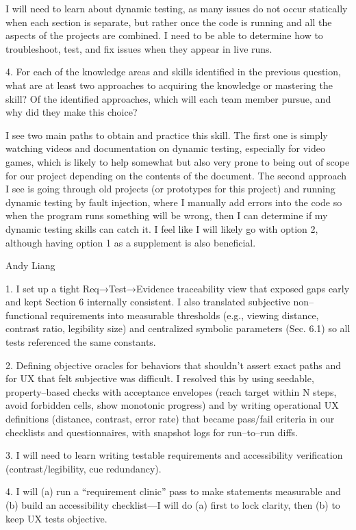 \documentclass[12pt, titlepage]{article}
\begin{document}
I will need to learn about dynamic testing, as many issues do not occur statically when each section is separate, but rather once the code is running and all the aspects of the projects are combined. I need to be able to determine how to troubleshoot, test, and fix issues when they appear in live runs.

4. For each of the knowledge areas and skills identified in the previous question, what are at least two approaches to acquiring the knowledge or mastering the skill? Of the identified approaches, which will each team member pursue, and why did they make this choice?

I see two main paths to obtain and practice this skill. The first one is simply watching videos and documentation on dynamic testing, especially for video games, which is likely to help somewhat but also very prone to being out of scope for our project depending on the contents of the document. The second approach I see is going through old projects (or prototypes for this project) and running dynamic testing by fault injection, where I manually add errors into the code so when the program runs something will be wrong, then I can determine if my dynamic testing skills can catch it. I feel like I will likely go with option 2, although having option 1 as a supplement is also beneficial.

Andy Liang

1. I set up a tight Req→Test→Evidence traceability view that exposed gaps early and kept Section 6 internally consistent. I also translated subjective non--functional requirements into measurable thresholds (e.g., viewing distance, contrast ratio, legibility size) and centralized symbolic parameters (Sec. 6.1) so all tests referenced the same constants.

2. Defining objective oracles for behaviors that shouldn’t assert exact paths and for UX that felt subjective was difficult. I resolved this by using seedable, property--based checks with acceptance envelopes (reach target within N steps, avoid forbidden cells, show monotonic progress) and by writing operational UX definitions (distance, contrast, error rate) that became pass/fail criteria in our checklists and questionnaires, with snapshot logs for run--to--run diffs.

3. I will need to learn writing testable requirements and accessibility verification (contrast/legibility, cue redundancy).

4. I will (a) run a “requirement clinic” pass to make statements measurable and (b) build an accessibility checklist—I will do (a) first to lock clarity, then (b) to keep UX tests objective.
\end{document}
